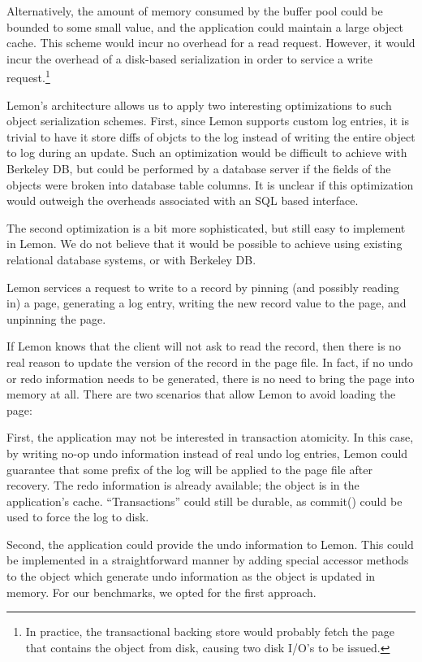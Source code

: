 \documentclass[letterpaper,twocolumn,english]{article}
\newcommand{\yad}{Lemon\xspace}
\begin{document}
Alternatively, the amount of memory consumed by the buffer pool could
be bounded to some small value, and the application could maintain a
large object cache.  This scheme would incur no overhead for a read
request.  However, it would incur the overhead of a disk-based
serialization in order to service a write request.\footnote{In
practice, the transactional backing store would probably fetch the
page that contains the object from disk, causing two disk I/O's to be
issued.}

\yad's architecture allows us to apply two interesting optimizations
to such object serialization schemes.  First, since \yad supports
custom log entries, it is trivial to have it store diffs of objcts to
the log instead of writing the entire object to log during an update.
Such an optimization would be difficult to achieve with Berkeley DB,
but could be performed by a database server if the fields of the
objects were broken into database table columns.  It is unclear if
this optimization would outweigh the overheads associated with an SQL
based interface.


The second optimization is a bit more sophisticated, but still easy to
implement in \yad.  We do not believe that it would be possible to
achieve using existing relational database systems, or with Berkeley
DB.  

\yad services a request to write to a record by pinning (and possibly
reading in) a page, generating a log entry, writing the
new record value to the page, and unpinning the page.

If \yad knows that the client will not ask to read the record, then
there is no real reason to update the version of the record in the
page file.  In fact, if no undo or redo information needs to be
generated, there is no need to bring the page into memory at all.
There are two scenarios that allow \yad to avoid loading the page:

First, the application may not be interested in transaction atomicity.
In this case, by writing no-op undo information instead of real undo
log entries, \yad could guarantee that some prefix of the log will be
applied to the page file after recovery.  The redo information is
already available; the object is in the application's cache.
``Transactions'' could still be durable, as commit() could be used to
force the log to disk.

Second, the application could provide the undo information to \yad.
This could be implemented in a straightforward manner by adding
special accessor methods to the object which generate undo information
as the object is updated in memory.  For our benchmarks, we opted for
the first approach.
\end{document}
